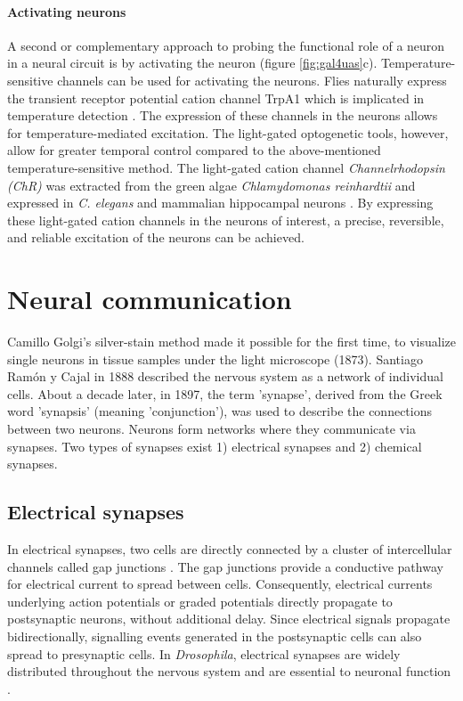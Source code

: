 \paragraph{Activating neurons}
A second or complementary approach to probing the functional role of a neuron in a neural circuit is by activating the neuron (figure \ref{fig:gal4uas}c). Temperature-sensitive channels can be used for activating the neurons. Flies naturally express the transient receptor potential cation channel TrpA1 which is implicated in temperature detection \parencite{Hamada2008, Pulver2009}. The expression of these channels in the neurons allows for temperature-mediated excitation. The light-gated optogenetic tools, however, allow for greater temporal control compared to the above-mentioned temperature-sensitive method. The light-gated cation channel \textit{Channelrhodopsin (ChR)} was extracted from the green algae \textit{Chlamydomonas reinhardtii} and expressed in \textit{C. elegans} and mammalian hippocampal neurons \parencite{Nagel2005, Boyden2005}. By expressing these light-gated cation channels in the neurons of interest, a precise, reversible, and reliable excitation of the neurons can be achieved.

\section{Neural communication}
Camillo Golgi's silver-stain method made it possible for the first time, to visualize single neurons in tissue samples under the light microscope (1873). Santiago Ramón y Cajal in 1888 described the nervous system as a network of individual cells. About a decade later, in 1897, the term 'synapse', derived from the Greek word 'synapsis' (meaning 'conjunction'), was used to describe the connections between two neurons. Neurons form networks where they communicate via synapses. Two types of synapses exist 1) electrical synapses and 2) chemical synapses.

\subsection{Electrical synapses}
In electrical synapses, two cells are directly connected by a cluster of intercellular channels called gap junctions \parencite{Bennett2004}. The gap junctions provide a conductive pathway for electrical current to spread between cells. Consequently, electrical currents underlying action potentials or graded potentials directly propagate to postsynaptic neurons, without additional delay. Since electrical signals propagate bidirectionally, signalling events generated in the postsynaptic cells can also spread to presynaptic cells. In \textit{Drosophila}, electrical synapses are widely distributed throughout the nervous system and are essential to neuronal function \parencite{Ammer2022, Stebbings2002, Liu2016}.

